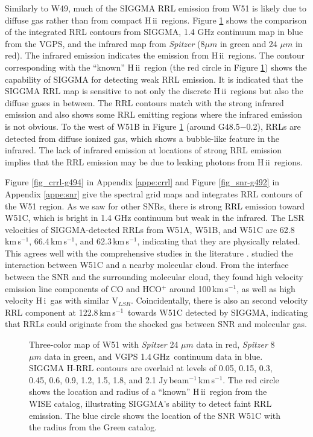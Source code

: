 \documentclass[manuscript]{aastex61}
\newcommand{\hii}{{\rm H\,}{{\sc ii}}}
\newcommand{\hi}{{\rm H\,}{{\sc i}}}
\newcommand{\kms}{\,km\,s$^{-1}$}
\newcommand{\ghz}{\,GHz}
\newcommand{\um}{\mu m}
\begin{document}
Similarly to W49, much of the SIGGMA RRL emission from W51 is likely due to diffuse gas rather than from compact \hii\ regions.
Figure \ref{w51_map} shows the comparison of the integrated RRL contours from SIGGMA, 1.4 GHz continuum map in blue from the VGPS, and the infrared map from {\it Spitzer} (8$\um$ in green and 24 $\um$ in red).
The infrared emission indicates the emission from \hii\ regions.
The contour corresponding with the ``known'' \hii\ region (the red circle in Figure \ref{w51_map}) shows the capability of SIGGMA for detecting weak RRL emission.
It is indicated that the SIGGMA RRL map is sensitive to not only the discrete \hii\ regions but also the diffuse gases in between.
The RRL contours match with the strong infrared emission and also shows some RRL emitting regions where the infrared emission is not obvious.
To the west of W51B in Figure \ref{w51_map} (around G48.5$-$0.2), RRLs are detected from diffuse ionized gas, which shows a bubble-like feature in the infrared.
The lack of infrared emission at locations of strong RRL emission implies that the RRL emission may be due to leaking photons from \hii\ regions.

Figure \ref{fig_crrl-g494} in Appendix \ref{appe:crrl} and Figure \ref{fig_snr-g492} in Appendix \ref {appe:snr} give the spectral grid maps and integrates RRL contours of the W51 region.
As we saw for other SNRs, there is strong RRL emission toward W51C, which is bright in 1.4 GHz continuum but weak in the infrared.
The LSR velocities of SIGGMA-detected RRLs from W51A, W51B, and W51C are 62.8\kms, 66.4\kms, and 62.3\kms, indicating that they are physically related.
This agrees well with the comprehensive studies in the literature \citep{Mufson1979, Mehringer1994, Brogan2013}.
\citet{Koo1997a, Koo1997b} studied the interaction between W51C and a nearby molecular cloud.
From the interface between the SNR and the surrounding molecular cloud, they found high velocity emission line components of CO and HCO$^{+}$ around 100\kms, as well as high velocity \hi\ gas with similar V$_{LSR}$.
Coincidentally, there is also an second velocity RRL component at 122.8\kms\ towards W51C detected by SIGGMA, indicating that RRLs could originate from the shocked gas between SNR and molecular gas.

\begin{figure}[htbp]
\centering
{}
\caption{Three-color map of W51 
with {\it Spitzer} 24 $\um$ data in red,  {\it Spitzer} 8 $\um$ data in green, and VGPS 1.4\ghz\ continuum data in blue. 
SIGGMA H-RRL contours are overlaid at levels of 0.05, 0.15, 0.3, 0.45, 0.6, 0.9, 1.2, 1.5, 1.8, and 2.1 Jy\,beam$^{-1}$\kms. The red circle shows the location and radius of a ``known'' \hii\ region from the WISE catalog, illustrating SIGGMA's ability to detect faint RRL emission. The blue circle shows the location of the SNR W51C with the radius from the Green catalog.}\label{w51_map}
\end{figure}
\end{document}
